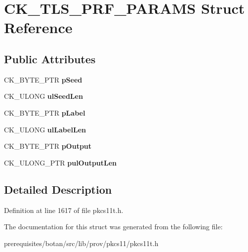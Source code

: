 \hypertarget{struct_c_k___t_l_s___p_r_f___p_a_r_a_m_s}{}\section{C\+K\+\_\+\+T\+L\+S\+\_\+\+P\+R\+F\+\_\+\+P\+A\+R\+A\+MS Struct Reference}
\label{struct_c_k___t_l_s___p_r_f___p_a_r_a_m_s}
\subsection*{Public Attributes}
\begin{DoxyCompactItemize}
\item 
\mbox{\label{struct_c_k___t_l_s___p_r_f___p_a_r_a_m_s_aa012b8b8d63420d7f362aea1fa01ab8e}} 
C\+K\+\_\+\+B\+Y\+T\+E\+\_\+\+P\+TR {\bfseries p\+Seed}
\item 
\mbox{\label{struct_c_k___t_l_s___p_r_f___p_a_r_a_m_s_aae15be52f15063f44a1aaa60dd342171}} 
C\+K\+\_\+\+U\+L\+O\+NG {\bfseries ul\+Seed\+Len}
\item 
\mbox{\label{struct_c_k___t_l_s___p_r_f___p_a_r_a_m_s_ad2cc7fd882acaa3a6bdb6154de8a111f}} 
C\+K\+\_\+\+B\+Y\+T\+E\+\_\+\+P\+TR {\bfseries p\+Label}
\item 
\mbox{\label{struct_c_k___t_l_s___p_r_f___p_a_r_a_m_s_ab34e2fdf546644631b1d029ba636c5cd}} 
C\+K\+\_\+\+U\+L\+O\+NG {\bfseries ul\+Label\+Len}
\item 
\mbox{\label{struct_c_k___t_l_s___p_r_f___p_a_r_a_m_s_a2149f3e8e3b28dc29ed3c7a1a3d9696c}} 
C\+K\+\_\+\+B\+Y\+T\+E\+\_\+\+P\+TR {\bfseries p\+Output}
\item 
\mbox{\label{struct_c_k___t_l_s___p_r_f___p_a_r_a_m_s_ac52ea2c9eac0b87c96eba125e814058b}} 
C\+K\+\_\+\+U\+L\+O\+N\+G\+\_\+\+P\+TR {\bfseries pul\+Output\+Len}
\end{DoxyCompactItemize}


\subsection{Detailed Description}


Definition at line 1617 of file pkcs11t.\+h.



The documentation for this struct was generated from the following file\+:\begin{DoxyCompactItemize}
\item 
prerequisites/botan/src/lib/prov/pkcs11/pkcs11t.\+h\end{DoxyCompactItemize}
